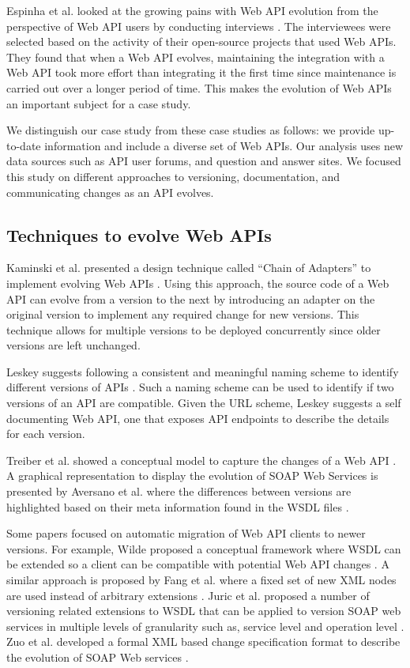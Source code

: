 Espinha et al. looked at the growing pains with Web API evolution from the perspective of Web API users by conducting interviews \cite{espinha}. The interviewees were selected based on the activity of their open-source projects that used Web APIs. They found that when a Web API evolves, maintaining the integration with a Web API took more effort than integrating it the first time since maintenance is carried out over a longer period of time. This makes the evolution of Web APIs an important subject for a case study.

We distinguish our case study from these case studies as follows: we provide up-to-date information and include a diverse set of Web APIs. Our analysis uses new data sources such as API user forums, and question and answer sites. We focused this study on different approaches to versioning, documentation, and communicating changes as an API evolves.

\subsection{Techniques to evolve Web APIs} %
\label{sub:techniques}
Kaminski et al. presented a design technique called ``Chain of Adapters'' to implement evolving Web APIs \cite{kaminski2006design}. Using this approach, the source code of a Web API can evolve from a version to the next by introducing an adapter on the original version to implement any required change for new versions. This technique allows for multiple versions to be deployed concurrently since older versions are left unchanged.

Leskey suggests following a consistent and meaningful naming scheme to identify different versions of APIs \cite{laskey2008considerations}. Such a naming scheme can be used to identify if two versions of an API are compatible. Given the URL scheme, Leskey suggests a self documenting Web API, one that exposes API endpoints to describe the details for each version.

Treiber et al. showed a conceptual model to capture the changes of a Web API \cite{treiber2009analyzing}. A graphical representation to display the evolution of SOAP Web Services is presented by Aversano et al. where the differences between versions are highlighted based on their meta information found in the WSDL files \cite{aversano2005visualizing}.

Some papers focused on automatic migration of Web API clients to newer versions. For example, Wilde proposed a conceptual framework where WSDL can be extended so a client can be compatible with potential Web API changes \cite{wilde2004semantically}. A similar approach is proposed by Fang et al. where a fixed set of new XML nodes are used instead of arbitrary extensions \cite{fang2007version}. Juric et al. proposed a number of versioning related extensions to WSDL that can be applied to version SOAP web services in multiple levels of granularity such as, service level and operation level \cite{Juric20091326}. Zuo et al. developed a formal XML based change specification format to describe the evolution of SOAP Web services \cite{zuo6928972}.

